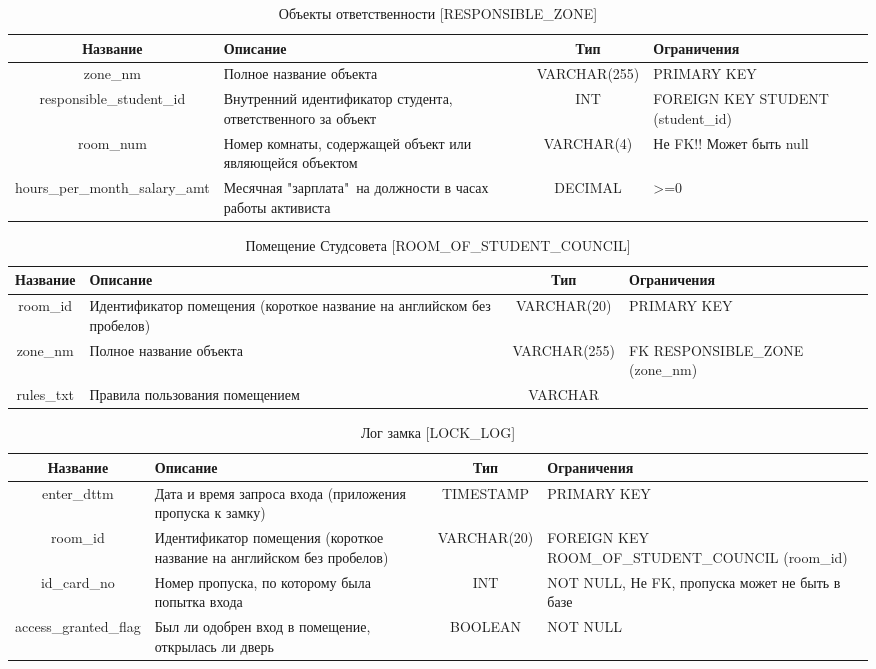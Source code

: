 \documentclass[a4paper,]{article}
\begin{document}
\begin{table}[H]
	\footnotesize
	\center
	\begin{tabular}[center]{|c|p{3.8cm}|c|p{3cm}|}
		\hline
		Название & Описание & Тип & Ограничения \\ \hline
		zone\_nm & Полное название объекта & VARCHAR(255) & PRIMARY KEY \\ \hline
		responsible\_student\_id & Внутренний идентификатор студента, ответственного за объект & INT & FOREIGN KEY STUDENT (student\_id) \\ \hline
		room\_num & Номер комнаты, содержащей объект или являющейся объектом & VARCHAR(4) & Не FK!! Может быть null \\ \hline
		hours\_per\_month\_salary\_amt & Месячная "зарплата"\ на должности в часах работы активиста & DECIMAL & >=0 \\ \hline
	\end{tabular}
	\caption{Объекты ответственности [RESPONSIBLE\_ZONE]}
\end{table}

\begin{table}[H]
	\footnotesize
	\center
	\begin{tabular}[center]{|c|p{4cm}|c|p{3cm}|}
		\hline
		Название & Описание & Тип & Ограничения \\ \hline
		room\_id & Идентификатор помещения (короткое название на английском без пробелов) & VARCHAR(20) & PRIMARY KEY \\ \hline
		zone\_nm & Полное название объекта & VARCHAR(255) & FK RESPONSIBLE\_ZONE (zone\_nm) \\ \hline
		rules\_txt & Правила пользования помещением & VARCHAR &  \\ \hline
	\end{tabular}
	\caption{Помещение Студсовета [ROOM\_OF\_STUDENT\_COUNCIL]}
\end{table}

\begin{table}[H]
	\footnotesize
	\center
	\begin{tabular}[center]{|c|p{4cm}|c|p{4.8cm}|}
		\hline
		Название & Описание & Тип & Ограничения \\ \hline
		enter\_dttm & Дата и время запроса входа (приложения пропуска к замку) & TIMESTAMP & PRIMARY KEY \\ \hline
		room\_id & Идентификатор помещения (короткое название на английском без пробелов) & VARCHAR(20) & FOREIGN KEY ROOM\_OF\_STUDENT\_COUNCIL (room\_id)
		 \\ \hline
		id\_card\_no & Номер пропуска, по которому была попытка входа & INT & NOT NULL, Не FK, пропуска может не быть в базе \\ \hline
		access\_granted\_flag & Был ли одобрен вход в помещение, открылась ли дверь & BOOLEAN & NOT NULL \\ \hline
	\end{tabular}
	\caption{Лог замка [LOCK\_LOG]}
\end{table}
\end{document}
